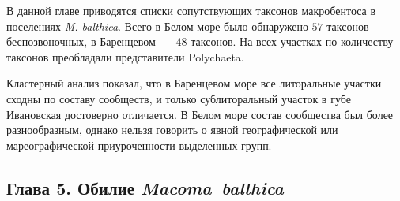{В данной главе приводятся списки сопутствующих таксонов макробентоса в поселениях {\it M. balthica}.
Всего в Белом море было обнаружено $57$ таксонов беспозвоночных, в Баренцевом~--- $48$ таксонов.
На всех участках по количеству таксонов преобладали представители Polychaeta.

Кластерный анализ показал, что в Баренцевом море все литоральные участки сходны по составу сообществ, и только сублиторальный участок в губе Ивановская достоверно отличается.
В Белом море состав сообщества был более разнообразным, однако нельзя говорить о явной географической или мареографической приуроченности выделенных групп.



\subsection*{Глава 5. Обилие \textit{Macoma~balthica}}

}
